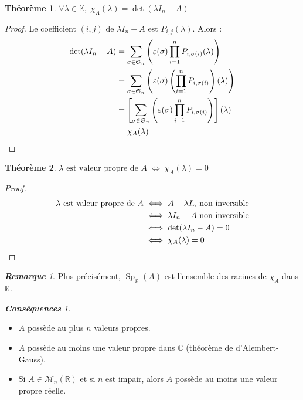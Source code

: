 \documentclass[12pt]{book}
\let\ensembleNombre\mathbb
\newcommand*\R{\ensuremath{\ensembleNombre{R}}}
\newcommand*\C{\ensuremath{\ensembleNombre{C}}}
\newcommand*\K{\ensuremath{\ensembleNombre{K}}}
\DeclareMathOperator{\Sp}{Sp}
\theoremstyle{definition}
\newtheorem{thme}{Théorème}[chapter]
\theoremstyle{remark}
\newtheorem*{conss}{\textbf{Conséquences}}
\newtheorem*{rem}{\textbf{Remarque}}
\newenvironment{fthme}
  {\begin{mdframed}[roundcorner=10pt, linewidth=2pt]\begin{thme}}
  {\end{thme}\end{mdframed}}
\begin{document}
	\begin{fthme}
	$ \forall \lambda \in \K,\; \boxed{ \chi_A(\lambda) = \det (\lambda I_n - A) }$
	\end{fthme}
	\begin{proof}
	Le coefficient $(i,j)$ de $\lambda I_n - A$ est $P_{i,j}(\lambda)$. Alors :
	\begin{align*}
	\det(\lambda I_n - A) &= \sum_{\sigma \in \mathfrak S_n} \left( \varepsilon(\sigma) \prod_{i=1}^n P_{i, \sigma(i)}(\lambda) \right) \\
	&= \sum_{\sigma \in \mathfrak S_n} \left( \varepsilon(\sigma) \left(\prod_{i=1}^n P_{i, \sigma(i)}\right)(\lambda) \right) \\
	&= \left[ \sum_{\sigma \in \mathfrak S_n} \left( \varepsilon(\sigma)\prod_{i=1}^n P_{i, \sigma(i)} \right)\right](\lambda) \\
	&= \chi_A(\lambda)\qedhere
	\end{align*}
	\end{proof}
	
	\begin{fthme}
	$ \lambda \text{ est valeur propre de } A \; \Longleftrightarrow\; \chi_A(\lambda) = 0 $
	\end{fthme}
	\begin{proof}
		\begin{align*}
		\lambda \text{ est valeur propre de } A \; &\Longleftrightarrow\; A - \lambda I_n \text{ non inversible}\\
		&\Longleftrightarrow \; \lambda I_n - A \text{ non inversible} \\
		&\Longleftrightarrow \; \det(\lambda I_n - A) = 0 \\
		&\Longleftrightarrow \; \chi_A(\lambda) = 0\qedhere
		\end{align*}
	\end{proof}
	
	\begin{rem}
	Plus précisément, $\Sp_\K(A)$ est l'ensemble des racines de $\chi_A$ dans $\K$.
	\end{rem}
	\begin{conss} \mbox{~}\\
		\begin{itemize}
		\item[1)] $A$ possède au plus $n$ valeurs propres.
		\item[2)] $A$ possède au moins une valeur propre dans $\C$ (théorème de d'Alembert-Gauss).
		\item[3)] Si $A \in \mathcal M_n(\R)$ et si $n$ est impair, alors $A$ possède au moins une valeur propre réelle.
		\end{itemize}
	\end{conss}
	
\end{document}
